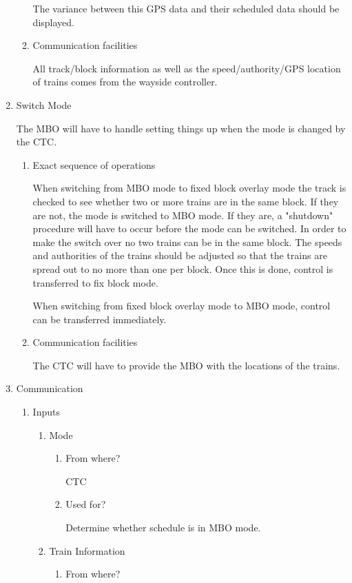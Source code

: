 \documentclass[11pt]{article}
\begin{document}
\begin{enumerate}
\begin{enumerate}
The variance between this GPS data and their scheduled data should be displayed.
\item Communication facilities
\label{sec-3-1-6-2-0-2}

All track/block information as well as the speed/authority/GPS location of trains comes from the wayside controller.
\end{enumerate}
\item Switch Mode
\label{sec-3-1-6-3}

The MBO will have to handle setting things up when the mode is changed by the CTC.
\begin{enumerate}
\item Exact sequence of operations
\label{sec-3-1-6-3-1}

When switching from MBO mode to fixed block overlay mode the track is checked to see whether two or more trains are in the same block. If they are not, the mode is switched to MBO mode. If they are, a "shutdown" procedure will have to occur before the mode can be switched. In order to make the switch over no two trains can be in the same block. The speeds and authorities of the trains should be adjusted so that the trains are spread out to no more than one per block. Once this is done, control is transferred to fix block mode.

When switching from fixed block overlay mode to MBO mode, control can be transferred immediately.
\item Communication facilities
\label{sec-3-1-6-3-2}

The CTC will have to provide the MBO with the locations of the trains.
\end{enumerate}
\item Communication
\label{sec-3-1-6-4}
\begin{enumerate}
\item Inputs
\label{sec-3-1-6-4-1}
\begin{enumerate}
\item Mode
\label{sec-3-1-6-4-1-1}
\begin{enumerate}
\item From where?
\label{sec-3-1-6-4-1-1-1}

CTC
\item Used for?
\label{sec-3-1-6-4-1-1-2}

Determine whether schedule is in MBO mode.
\end{enumerate}
\item Train Information
\label{sec-3-1-6-4-1-2}
\begin{enumerate}
\item From where?
\label{sec-3-1-6-4-1-2-1}


\end{enumerate}
\end{enumerate}
\end{enumerate}
\end{enumerate}
\end{document}
